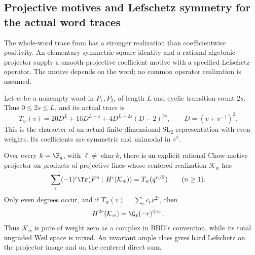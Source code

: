 \subsection{Projective motives and Lefschetz symmetry for the actual word traces}
The whole-word trace from  has a stronger realization than
coefficientwise positivity. An elementary symmetric-square identity
and a rational algebraic projector supply a smooth-projective
coefficient motive with a specified Lefschetz operator. The motive
depends on the word; no common operator realization is assumed.

\begin{finding}\label{f:projectiveword}
Let $w$ be a nonempty word in $P_1,P_2$, of length $L$ and
cyclic transition count $2s$. Thus $0\le2s\le L$, and its actual
trace is
\[
 T_w(v)=20D^L+16D^{L-s}+4D^{L-2s}(D-2)^{2s},
 \qquad D=(v+v^{-1})^2.
\]
This is the character of an actual finite-dimensional
$\mathrm{SL}_2$-representation with even weights. Its coefficients
are symmetric and unimodal in $v^2$.

Over every $k=\F_q$, with $\ell\ne\operatorname{char}k$, there is
an explicit rational Chow-motive projector on products of
projective lines whose centered realization $\mathcal K_w$ has
\begin{equation}\label{eq:projectivewordtrace}
 \sum_i(-1)^i\Tr(F^n\mid H^i(\mathcal K_w))
             =T_w(q^{n/2})\qquad(n\ge1).
\end{equation}
Only even degrees occur, and if $T_w(v)=\sum_r c_rv^{2r}$, then
\[
 H^{2r}(\mathcal K_w)=\Q_\ell(-r)^{\oplus c_r}.
\]
Thus $\mathcal K_w$ is pure of weight zero as a complex in BBD's
convention, while its total ungraded Weil space is mixed.
An invariant ample class gives hard Lefschetz on the projector
image and on the centered direct sum.
\end{finding}
